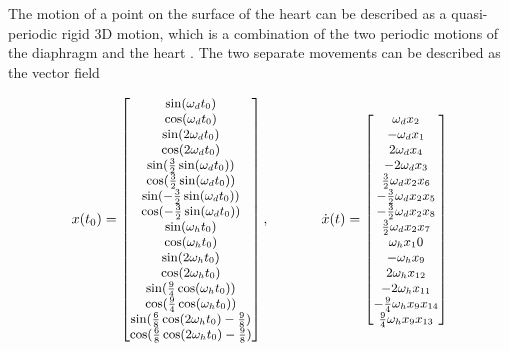 The motion of a point on the surface of the heart can be described as a quasi-periodic rigid 3D motion, which is a combination of the two periodic motions of the diaphragm and the heart \citep{bib:heart_berkeley}. The two separate movements can be described as the vector field \citep{bib:heart_model}

\begin{equation}
\small
x(t_0) = 
\begin{bmatrix}
\sin(\omega_d t_0)\\
\cos(\omega_d t_0)\\
\sin(2 \omega_d t_0)\\
\cos(2 \omega_d t_0)\\
\sin(\tfrac{3}{2}\sin(\omega_d t_0))\\
\cos(\tfrac{3}{2} \sin(\omega_d t_0))\\
\sin(-\tfrac{3}{2} \sin(\omega_d t_0))\\
\cos(-\tfrac{3}{2} \sin(\omega_d t_0))\\
\sin(\omega_h t_0)\\
\cos(\omega_h t_0)\\
\sin(2 \omega_h t_0)\\
\cos(2 \omega_h t_0)\\
\sin(\tfrac{9}{4} \cos(\omega_h t_0))\\
\cos(\tfrac{9}{4} \cos(\omega_h t_0))\\
\sin(\tfrac{6}{8} \cos(2 \omega_h t_0)-\tfrac{9}{8})\\
\cos(\tfrac{6}{8} \cos(2 \omega_h t_0)-\tfrac{9}{8})
\end{bmatrix},
\qquad\qquad
\dot{x}(t) =
\begin{bmatrix}
 \omega_d x_2\\
- \omega_d x_1\\
2  \omega_d x_4\\
-2  \omega_d x_3\\
\tfrac{3}{2}  \omega_d x_2 x_6\\
-\tfrac{3}{2}  \omega_d x_2 x_5\\
-\tfrac{3}{2}  \omega_d x_2 x_8\\
\tfrac{3}{2}  \omega_d x_2 x_7\\
 \omega_h x_10\\
- \omega_h x_9\\
2 \omega_h x_{12}\\
-2 \omega_h x_{11}\\
-\tfrac{9}{4} \omega_h x_9 x_{14}\\
\tfrac{9}{4} \omega_h x_9 x_{13}\\

\end{bmatrix}
\end{equation}
